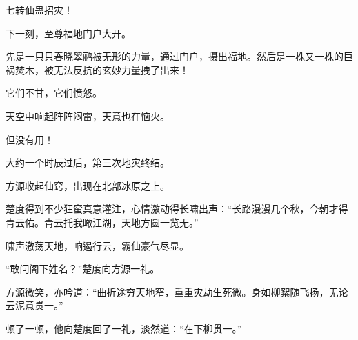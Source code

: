 \begin{this_body}
七转仙蛊招灾！

下一刻，至尊福地门户大开。

先是一只只春晓翠鹂被无形的力量，通过门户，摄出福地。然后是一株又一株的巨祸焚木，被无法反抗的玄妙力量拽了出来！

它们不甘，它们愤怒。

天空中响起阵阵闷雷，天意也在恼火。

但没有用！

大约一个时辰过后，第三次地灾终结。

方源收起仙窍，出现在北部冰原之上。

楚度得到不少狂蛮真意灌注，心情激动得长啸出声：“长路漫漫几个秋，今朝才得青云佑。青云托我瞰江湖，天地方圆一览无。”

啸声激荡天地，响遏行云，霸仙豪气尽显。

“敢问阁下姓名？”楚度向方源一礼。

方源微笑，亦吟道：“曲折途穷天地窄，重重灾劫生死微。身如柳絮随飞扬，无论云泥意贯一。”

顿了一顿，他向楚度回了一礼，淡然道：“在下柳贯一。”

\end{this_body}

